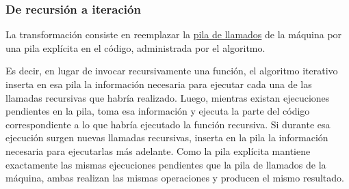 \subsubsection{De recursión a iteración}

La transformación consiste en reemplazar la \hyperref[sec:pila_de_llamados]{pila de llamados} de la máquina por una pila explícita en el código, administrada por el algoritmo. 

Es decir, en lugar de invocar recursivamente una función, el algoritmo iterativo inserta en esa pila la información necesaria para ejecutar cada una de las llamadas recursivas que habría realizado. Luego, mientras existan ejecuciones pendientes en la pila, toma esa información y ejecuta la parte del código correspondiente a lo que habría ejecutado la función recursiva. Si durante esa ejecución surgen nuevas llamadas recursivas, inserta en la pila la información necesaria para ejecutarlas más adelante. Como la pila explícita mantiene exactamente las mismas ejecuciones pendientes que la pila de llamados de la máquina, ambas realizan las mismas operaciones y producen el mismo resultado.

